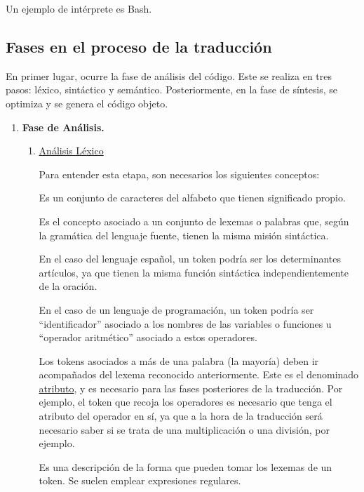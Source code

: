 Un ejemplo de intérprete es Bash.


\subsection{Fases en el proceso de la traducción}
En primer lugar, ocurre la fase de análisis del código. Este se realiza en tres pasos: léxico, sintáctico y semántico. Posteriormente, en la fase de síntesis, se optimiza y se genera el código objeto.
\begin{enumerate}
    \item \textbf{Fase de Análisis.}
    \renewcommand{\theenumii}{\theenumi.\arabic{enumii}}
    \begin{enumerate}
        \item \underline{Análisis Léxico}

        Para entender esta etapa, son necesarios los siguientes conceptos:
        
        \begin{definicion} Es un conjunto de caracteres del alfabeto que tienen significado propio. 
        \end{definicion}

        \begin{definicion}[Token] Es el concepto asociado a un conjunto de lexemas o palabras que, según la gramática del lenguaje fuente, tienen la misma misión sintáctica.

        En el caso del lenguaje español, un token podría ser los determinantes artículos, ya que tienen la misma función sintáctica independientemente de la oración.

        En el caso de un lenguaje de programación, un token podría ser ``identificador'' asociado a los nombres de las variables o funciones u ``operador aritmético'' asociado a estos operadores.

        Los tokens asociados a más de una palabra (la mayoría) deben ir acompañados del lexema reconocido anteriormente. Este es el denominado \underline{atributo}, y es necesario para las fases posteriores de la traducción. Por ejemplo, el token que recoja los operadores es necesario que tenga el atributo del operador en sí, ya que a la hora de la traducción será necesario saber si se trata de una multiplicación o una división, por ejemplo.
        \end{definicion}

        \begin{definicion}[Patrón]
            Es una descripción de la forma que pueden tomar los lexemas de un token. Se suelen emplear expresiones regulares.
            

\end{definicion}
\end{enumerate}
\end{enumerate}
